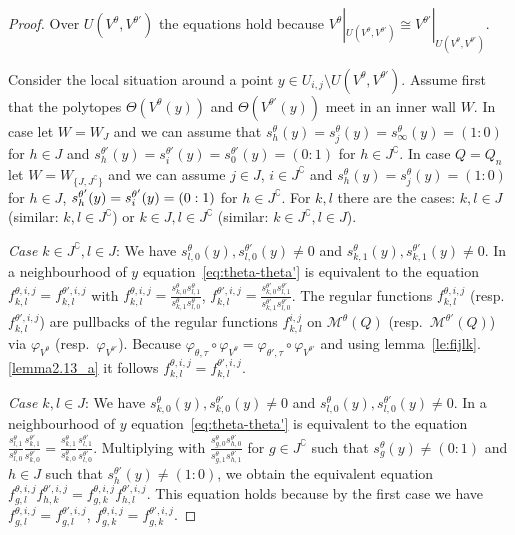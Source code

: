 \documentclass[ALCO,ThmDefs,Unicode,epreuves]{cedram}
\def\phi{\varphi}
\begin{document}
\begin{proof}
Over $U(V^\theta,V^{\theta'})$ the equations hold because
$V^\theta|_{U(V^\theta,V^{\theta'})}\cong V^{\theta'}|_{U(V^\theta,V^{\theta'})}$.

Consider the local situation around a point 
$y\in U_{i,j}\setminus U(V^\theta,V^{\theta'})$. 
Assume first that the polytopes $\Theta(V^\theta(y))$ and $\Theta(V^{\theta'}(y))$ 
meet in an inner wall $W$. 
In case %
{} let $W=W_J$ and we can assume that 
$s^\theta_h(y)=s^\theta_j(y)=s^\theta_\infty(y)=(1:0)$ for $h\in J$ and 
$s^{\theta'}_h(y)=s^{\theta'}_i(y)=s^{\theta'}_0(y)=(0:1)$ for $h\in J^\complement$. 
In case $Q=Q_n$ let $W=W_{\{J,J^\complement\}}$ and we can assume 
$j\in J$, $i\in J^\complement$ and $s^\theta_h(y)=s^\theta_j(y)=(1:0)$ 
for $h\in J$, $s^{\theta'}_h(y)=s^{\theta'}_i(y)= (0:\nobreak 1)$ for $h\in J^\complement$.
For $k,l$ there are the cases: $k,l\in J$ (similar: $k,l\in J^\complement$)
or $k\in J,l\in J^\complement$ (similar: $k\in J^\complement,l\in J$).

\emph{Case $k\in J^\complement,l\in J$}:
We have $s^\theta_{l,0}(y),s^{\theta'}_{l,0}(y)\neq0$ and 
$s^\theta_{k,1}(y),s^{\theta'}_{k,1}(y)\neq0$.
In a neighbourhood of $y$ equation~\eqref{eq:theta-theta'} is equivalent to the 
equation $f^{\theta,i,j}_{k,l}=f^{\theta',i,j}_{k,l}$ with 
$f^{\theta,i,j}_{k,l}=\frac{s^\theta_{k,0}s^\theta_{l,1}}{s^\theta_{k,1}s^\theta_{l,0}}$,
$f^{\theta',i,j}_{k,l}=\frac{s^{\theta'}_{k,0}s^{\theta'}_{l,1}}
{s^{\theta'}_{k,1}s^{\theta'}_{l,0}}$.
The regular functions $f^{\theta,i,j}_{k,l}$ (resp.\ $f^{\theta',i,j}_{k,l}$) 
are pullbacks of the regular functions $f^{i,j}_{k,l}$ on
$\mathcal M^\theta(Q)$ (resp.\ $\mathcal M^{\theta'}(Q)$) via 
$\phi_{V^\theta}$ (resp.\ $\phi_{V^{\theta'}}$). 
Because $\phi_{\theta,\tau}\circ\phi_{V^\theta}=\phi_{\theta',\tau}\circ\phi_{V^{\theta'}}$
and using lemma~\ref{le:fijlk}.\ref{lemma2.13_a} it follows $f^{\theta,i,j}_{k,l}=f^{\theta',i,j}_{k,l}$.

\emph{Case $k,l\in J$}:
We have $s^\theta_{k,0}(y),s^{\theta'}_{k,0}(y)\neq0$ and 
$s^\theta_{l,0}(y),s^{\theta'}_{l,0}(y)\neq0$.
In a neighbourhood of $y$ equation~\eqref{eq:theta-theta'} is equivalent to the equation
$\frac{s^\theta_{l,1}}{s^\theta_{l,0}}\frac{s^{\theta'}_{k,1}}{s^{\theta'}_{k,0}}
=\frac{s^\theta_{k,1}}{s^\theta_{k,0}}\frac{s^{\theta'}_{l,1}}{s^{\theta'}_{l,0}}$.
Multiplying with $\frac{s^\theta_{g,0}s^{\theta'}_{h,0}}{s^\theta_{g,1}s^{\theta'}_{h,1}}$
for $g\in J^\complement$ such that $s^\theta_g(y)\neq(0:1)$ and $h\in J$ such that 
$s^{\theta'}_h(y)\neq(1:0)$, we obtain the equivalent equation 
$f^{\theta,i,j}_{g,l}f^{\theta',i,j}_{h,k}=f^{\theta,i,j}_{g,k}f^{\theta',i,j}_{h,l}$.
This equation holds because by the first case we have 
$f^{\theta,i,j}_{g,l}=f^{\theta',i,j}_{g,l}$, $f^{\theta,i,j}_{g,k}=f^{\theta',i,j}_{g,k}$.


\end{proof}
\end{document}
